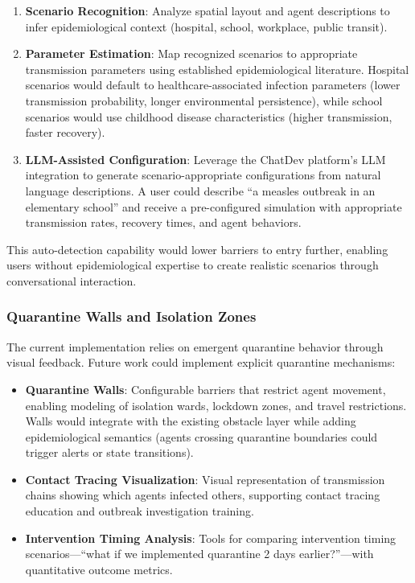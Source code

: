 \begin{enumerate}
    \item \textbf{Scenario Recognition}: Analyze spatial layout and agent descriptions to infer epidemiological context (hospital, school, workplace, public transit).
    
    \item \textbf{Parameter Estimation}: Map recognized scenarios to appropriate transmission parameters using established epidemiological literature. Hospital scenarios would default to healthcare-associated infection parameters (lower transmission probability, longer environmental persistence), while school scenarios would use childhood disease characteristics (higher transmission, faster recovery).
    
    \item \textbf{LLM-Assisted Configuration}: Leverage the ChatDev platform's LLM integration to generate scenario-appropriate configurations from natural language descriptions. A user could describe ``a measles outbreak in an elementary school'' and receive a pre-configured simulation with appropriate transmission rates, recovery times, and agent behaviors.
\end{enumerate}

This auto-detection capability would lower barriers to entry further, enabling users without epidemiological expertise to create realistic scenarios through conversational interaction.

\subsubsection{Quarantine Walls and Isolation Zones}

The current implementation relies on emergent quarantine behavior through visual feedback. Future work could implement explicit quarantine mechanisms:

\begin{itemize}
    \item \textbf{Quarantine Walls}: Configurable barriers that restrict agent movement, enabling modeling of isolation wards, lockdown zones, and travel restrictions. Walls would integrate with the existing obstacle layer while adding epidemiological semantics (agents crossing quarantine boundaries could trigger alerts or state transitions).
    
    \item \textbf{Contact Tracing Visualization}: Visual representation of transmission chains showing which agents infected others, supporting contact tracing education and outbreak investigation training.
    
    \item \textbf{Intervention Timing Analysis}: Tools for comparing intervention timing scenarios---``what if we implemented quarantine 2 days earlier?''---with quantitative outcome metrics.
\end{itemize}

